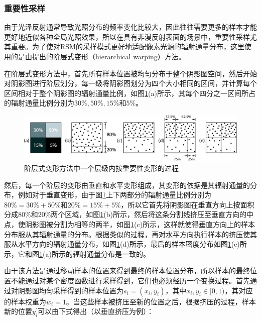 \subsubsection{重要性采样}
由于光泽反射通常导致光照分布的频率变化比较大，因此往往需要更多的样本才能更好地近似各种全局光照效果，所以在具有非漫反射表面的场景中，重要性采样尤其重要。为了使对RSM的采样模式更好地适配像素光源的辐射通量分布，这里使用的是由\cite{a:WaveletImportanceSampling}提出的阶层式变形（hierarchical warping）方法。 

在阶层式变形方法中，首先所有样本位置被均匀分布于整个阴影图空间，然后开始对阴影图进行阶层划分，每一级将阴影图划分为四个大小相同的区间，并计算每个区间相对于整个阴影图的辐射通量比例，如图\ref{f:ir-hierarchical-warping}(a)所示，其每个四分之一区间所占的辐射通量比例分别为$30\%,50\%,15\%和5\%$。

\begin{figure}
\begin{fullwidth}
	\includegraphics[width=1.0\thewidth]{figures/ir/ir-3-1}
	\caption{阶层式变形方法中一个层级内按重要性变形的过程}
	\label{f:ir-hierarchical-warping}
\end{fullwidth}
\end{figure}

然后，每一个阶层的变形由垂直和水平变形组成，其变形的依据是其辐射通量的分布，例如对于垂直变形，由于图\ref{f:ir-hierarchical-warping}上下两部分的辐射通量比例分别为$80\%=30\%+50\%$和$20\%=15\%+5\%$，所以它首先将阴影图在垂直方向上按面积分成80\%和20\%两个区域，如图\ref{f:ir-hierarchical-warping}(b)所示，然后将这条分割线挤压至垂直方向的中点，使阴影图被分割为相等的两半，如图\ref{f:ir-hierarchical-warping}(c)所示，这样就使得垂直方向上的样本分布服从其辐射通量的分布。根据类似的过程，再对水平方向执行样本的挤压使其服从水平方向的辐射通量分布，如图\ref{f:ir-hierarchical-warping}(d)所示，最后的样本密度分布如图\ref{f:ir-hierarchical-warping}(e)所示，它和图\ref{f:ir-hierarchical-warping}(a)所示的辐射通量分布是一致的。

由于该方法是通过移动样本的位置来得到最终的样本位置分布，所以样本的最终位置不能通过对某个密度函数进行采样得到，它们也必须经历一个变换过程。首先通过对阴影图均匀采样得到的样本位置为$s_i=(x_i,y_i)$，其中$x_i,y_i\in[0,1)$，其对应的样本权重为$w_i=1$。当这些样本被挤压至新的位置之后，根据挤压的过程，样本新的位置$y^{'}_i$可以由下式得出（以垂直挤压为例）：

